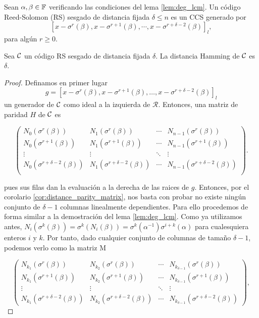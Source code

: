 \begin{definition}
\label{def:RS_code}
    Sean \(\alpha, \beta \in \mathbb{F}\) verificando las condiciones del lema \ref{lem:deg_lcm}. Un código Reed-Solomon (RS) sesgado de distancia fijada \(\delta \leq n\) es un CCS generado por \[{[x - \sigma^r(\beta), x - \sigma^{r+1}(\beta), \cdots, x - \sigma^{r + \delta -2}(\beta)]}_l,\] para algún \(r \geq 0\).
\end{definition}

\begin{theorem}
\label{th:distance}
    Sea \(\mathcal{C}\) un código RS sesgado de distancia fijada \(\delta\). La distancia Hamming de \(\mathcal{C}\) es \(\delta\).
\end{theorem}

\begin{proof}
Definamos en primer lugar
\[
g = {[x - \sigma^r(\beta), x - \sigma^{r+1}(\beta), \dots, x - \sigma^{r+\delta -2}(\beta)]}_l
\]
un generador de \(\mathcal{C}\) como ideal a la izquierda de \(\mathcal{R}\). Entonces, una matriz de paridad \(H\) de \(\mathcal{C}\) es

\[
\begin{pmatrix}
    N_0(\sigma^r(\beta)) & N_1(\sigma^r(\beta)) & \cdots & N_{n-1}(\sigma^r(\beta)) \\
    N_0(\sigma^{r+1}(\beta)) & N_1(\sigma^{r+1}(\beta)) & \cdots & N_{n-1}(\sigma^{r+1}(\beta)) \\
    \vdots & \vdots & \ddots & \vdots \\
    N_0(\sigma^{r+\delta-2}(\beta)) & N_1(\sigma^{r+\delta-2}(\beta)) & \cdots & N_{n-1}(\sigma^{r+\delta-2}(\beta)) \\
\end{pmatrix}
.\]

pues sus filas dan la evaluación a la derecha de las raices de \(g\). Entonces, por el corolario \ref{cor:distance_parity_matrix}, nos basta con probar no existe ningún conjunto de \(\delta -1\) columnas linealmente dependientes. Para ello procedemos de forma similar a la demostración del lema \ref{lem:deg_lcm}. Como ya utilizamos antes, \(N_i(\sigma^k(\beta)) = \sigma^k(N_i(\beta)) = \sigma^k(\alpha^{-1})\sigma^{i+k}(\alpha)\) para cualesquiera enteros \(i\) y \(k\). Por tanto, dado cualquier conjunto de columnas de tamaño \(\delta -1\), podemos verlo como la matriz M

\[
\begin{pmatrix}
    N_{k_1}(\sigma^r(\beta)) & N_{k_2}(\sigma^r(\beta)) & \cdots & N_{k_{\delta-1}}(\sigma^r(\beta)) \\
    N_{k_1}(\sigma^{r+1}(\beta)) & N_{k_2}(\sigma^{r+1}(\beta)) & \cdots & N_{k_{\delta-1}}(\sigma^{r+1}(\beta)) \\
    \vdots & \vdots & \ddots & \vdots \\
    N_{k_1}(\sigma^{r+\delta-2}(\beta)) & N_{k_2}(\sigma^{r+\delta-2}(\beta)) & \cdots & N_{k_{\delta-1}}(\sigma^{r+\delta-2}(\beta))
\end{pmatrix}
,\]


\end{proof}
